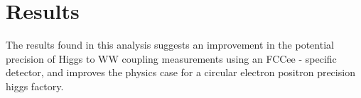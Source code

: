\documentclass[preprintnumbers,nofootinbib,noshowpacs,eqsecnum,prd,superscriptaddress,letterpaper]{revtex4}
\begin{document}


\section{Results}
\label{sec:results}

The results found in this analysis suggests an improvement in the potential precision of Higgs to WW coupling measurements using an FCCee - specific detector, and improves the physics case for a circular electron positron precision higgs factory. 

\end{document}

